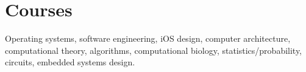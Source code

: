\section{Courses} 
\vspace{-1mm}
\par Operating systems, software engineering, iOS design, computer architecture, computational theory, algorithms, computational biology, statistics/probability, circuits, embedded systems design.